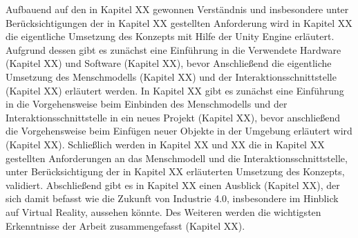 \newline
Aufbauend auf den in Kapitel XX gewonnen Verständnis und insbesondere unter Berücksichtigungen der in Kapitel XX gestellten Anforderung wird in Kapitel XX die eigentliche Umsetzung des Konzepts mit Hilfe der Unity Engine erläutert. Aufgrund dessen gibt es zunächst eine Einführung in die Verwendete Hardware (Kapitel XX) und Software (Kapitel XX), bevor Anschließend die eigentliche Umsetzung des Menschmodells (Kapitel XX) und der Interaktionsschnittstelle (Kapitel XX) erläutert werden.
\newline
In Kapitel XX gibt es zunächst eine Einführung in die Vorgehensweise beim Einbinden des Menschmodells und der Interaktionsschnittstelle in ein neues Projekt (Kapitel XX), bevor anschließend die Vorgehensweise beim Einfügen neuer Objekte in der Umgebung erläutert wird (Kapitel XX). Schließlich werden in Kapitel XX und XX die in Kapitel XX gestellten Anforderungen an das Menschmodell und die Interaktionsschnittstelle, unter Berücksichtigung der in Kapitel XX erläuterten Umsetzung des Konzepts, validiert.
\newline
Abschließend gibt es in Kapitel XX einen Ausblick (Kapitel XX), der sich damit befasst wie die Zukunft von Industrie 4.0, insbesondere im Hinblick auf Virtual Reality, aussehen könnte. Des Weiteren werden die wichtigsten Erkenntnisse der Arbeit zusammengefasst (Kapitel XX).


